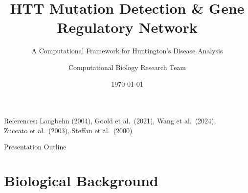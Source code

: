 \documentclass[aspectratio=169,11pt]{beamer}
\title{HTT Mutation Detection \& Gene Regulatory Network}
\subtitle{A Computational Framework for Huntington's Disease Analysis}
\author{Computational Biology Research Team}
\institute{Based on CFG/PCFG Parsing \& ODE Simulation}
\date{\today}
\begin{document}
\begin{frame}
    \titlepage
    \begin{center}
        \footnotesize
        References: Langbehn (2004), Goold et al.\ (2021), Wang et al.\ (2024), \\
        Zuccato et al.\ (2003), Steffan et al.\ (2000)
    \end{center}
\end{frame}

\begin{frame}{Presentation Outline}
    \tableofcontents
\end{frame}

\section{Biological Background}
\end{document}
